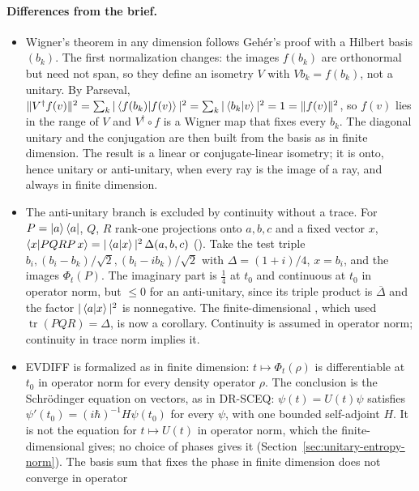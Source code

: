 \documentclass[11pt]{article}
\begin{document}
\paragraph{Differences from the brief.}
\begin{itemize}
\item Wigner's theorem in any dimension follows Geh\'er's proof with a Hilbert basis $(b_k)$. The
  first normalization changes: the images $f(b_k)$ are orthonormal but need not span, so they
  define an isometry $V$ with $Vb_k = f(b_k)$, not a unitary. By Parseval,
  $\|V^\dagger f(v)\|^2 = \sum_k |\braket{f(b_k)|f(v)}|^2 = \sum_k |\braket{b_k|v}|^2 = 1 =
  \|f(v)\|^2$, so $f(v)$ lies in the range of $V$ and $V^\dagger \circ f$ is a Wigner map that
  fixes every $b_k$. The diagonal unitary and the conjugation are then built from the basis as in
  finite dimension. The result is a linear or conjugate-linear isometry; it is onto, hence
  unitary or anti-unitary, when every ray is the image of a ray, and always in finite dimension.
\item The anti-unitary branch is excluded by continuity without a trace. For $P = \ket{a}\bra{a}$,
  $Q$, $R$ rank-one projections onto $a, b, c$ and a fixed vector $x$,
  $\braket{x|PQRP\,x} = |\braket{a|x}|^2\,\Delta(a,b,c)$
  (). Take the test triple
  $b_i, (b_i - b_k)/\sqrt2, (b_i - ib_k)/\sqrt2$ with $\Delta = (1+i)/4$, $x = b_i$, and the
  images $\Phi_t(P)$. The imaginary part is $\tfrac14$ at $t_0$ and continuous at $t_0$ in
  operator norm, but $\le 0$ for an anti-unitary, since its triple product is
  $\overline{\Delta}$ and the factor $|\braket{a|x}|^2$ is nonnegative. The finite-dimensional
  , which used $\operatorname{tr}(PQR) = \Delta$, is now
  a corollary. Continuity is assumed in operator norm; continuity in trace norm implies it.
\item EVDIFF is formalized as in finite dimension: $t \mapsto \Phi_t(\rho)$ is differentiable at
  $t_0$ in operator norm for every density operator $\rho$. The conclusion is the Schr\"odinger
  equation on vectors, as in DR-SCEQ: $\psi(t) = U(t)\psi$ satisfies $\psi'(t_0) = (i\hbar)^{-1}
  H\psi(t_0)$ for every $\psi$, with one bounded self-adjoint $H$. It is not the equation for
  $t \mapsto U(t)$ in operator norm, which the finite-dimensional 
  gives; no choice of phases gives it (Section~\ref{sec:unitary-entropy-norm}). The basis sum that fixes the phase in finite dimension does not converge in operator

\end{itemize}
\end{document}

